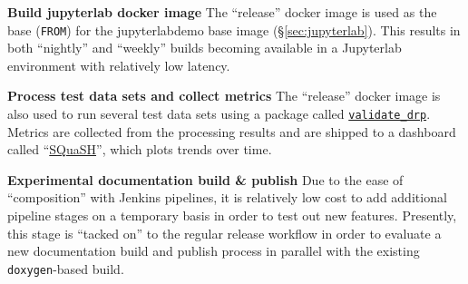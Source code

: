 \noindent \textbf{Build jupyterlab docker image}
The ``release'' docker image is used as the base (\texttt{FROM}) for the
jupyterlabdemo base image (\S\ref{sec:jupyterlab}).  This results in both
``nightly'' and ``weekly'' builds becoming available in a Jupyterlab environment
with relatively low latency.

\noindent \textbf{Process test data sets and collect metrics}
The ``release'' docker image is also used to run several test data sets using a
package called
\href{https://github.com/lsst/validate_drp/}{\texttt{validate\_drp}}.
Metrics are collected from the processing results and are shipped to a
dashboard called ``\href{https://squash.lsst.codes/}{SQuaSH}''\cite{SQR-009}, which plots
trends over time.

\noindent \textbf{Experimental documentation build \& publish}
Due to the ease of ``composition'' with Jenkins pipelines, it is relatively low
cost to add additional pipeline stages on a temporary basis in order to test out
new features.  Presently, this stage is ``tacked on'' to the regular release
workflow in order to evaluate a new documentation build and publish process in parallel
with the existing \texttt{doxygen}-based build.
